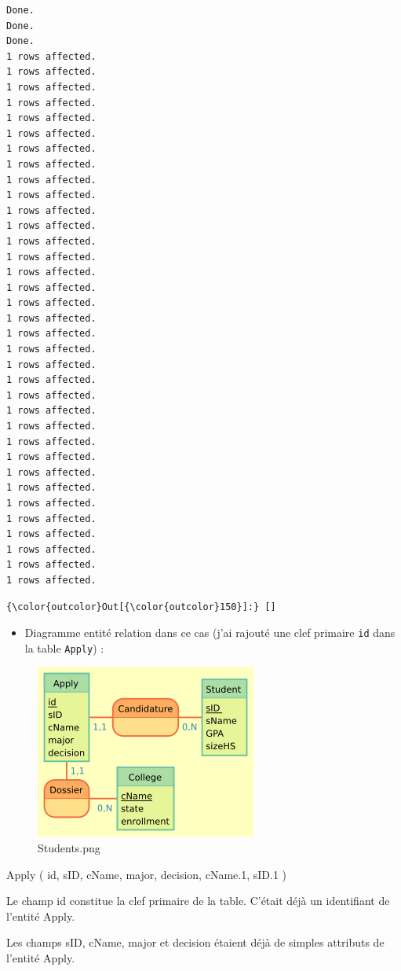 \documentclass[11pt]{article}
\makeatletter
\def\maxwidth{\ifdim\Gin@nat@width>\linewidth\linewidth
    \else\Gin@nat@width\fi}
\let\Oldincludegraphics\includegraphics
\renewcommand{\includegraphics}[1]{\Oldincludegraphics[width=.8\maxwidth]{#1}}
\providecommand{\tightlist}{%
      \setlength{\itemsep}{0pt}\setlength{\parskip}{0pt}}
\makeatother
\begin{document}
    \begin{Verbatim}[commandchars=\\\{\}]
Done.
Done.
Done.
1 rows affected.
1 rows affected.
1 rows affected.
1 rows affected.
1 rows affected.
1 rows affected.
1 rows affected.
1 rows affected.
1 rows affected.
1 rows affected.
1 rows affected.
1 rows affected.
1 rows affected.
1 rows affected.
1 rows affected.
1 rows affected.
1 rows affected.
1 rows affected.
1 rows affected.
1 rows affected.
1 rows affected.
1 rows affected.
1 rows affected.
1 rows affected.
1 rows affected.
1 rows affected.
1 rows affected.
1 rows affected.
1 rows affected.
1 rows affected.
1 rows affected.
1 rows affected.
1 rows affected.
1 rows affected.
1 rows affected.

    \end{Verbatim}

\begin{Verbatim}[commandchars=\\\{\}]
{\color{outcolor}Out[{\color{outcolor}150}]:} []
\end{Verbatim}
            
    \begin{itemize}
\tightlist
\item
  Diagramme entité relation dans ce cas (j'ai rajouté une clef primaire
  \texttt{id} dans la table \texttt{Apply}) :
\end{itemize}

\begin{figure}
\centering
\includegraphics{mocodo/Stanford/Students.png}
\caption{Students.png}
\end{figure}

{Apply} ( {id}, {sID}, {cName}, {major}, {decision}, {cName.1}, {sID.1}
)

Le champ id constitue la clef primaire de la table. C'était déjà un
identifiant de l'entité Apply.

Les champs sID, cName, major et decision étaient déjà de simples
attributs de l'entité Apply.
\end{document}

